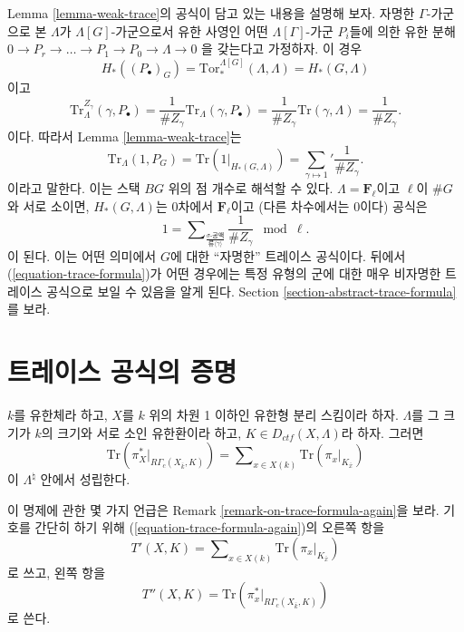 \begin{remark}
\label{remark-content-trivial-trace}
Lemma \ref{lemma-weak-trace}의 공식이 담고 있는 내용을 설명해 보자.
자명한 $\Gamma$-가군으로 본 $\Lambda$가
$\Lambda[G]$-가군으로서 유한 사영인 어떤
$\Lambda[\Gamma]$-가군 $P_i$들에 의한 유한 분해
$
0\to P_r\to \ldots \to P_1 \to P_0\to \Lambda\to 0
$
을 갖는다고 가정하자. 이 경우
$$
H_*\left(\left(P_\bullet\right)_G\right) =
\text{Tor}_*^{\Lambda[G]}\left(\Lambda, \Lambda\right) = H_*(G, \Lambda)
$$
이고
$$
\text{Tr}_\Lambda^{Z_\gamma}\left(\gamma, P_\bullet\right) =\frac{1}{\#
Z_\gamma}\text{Tr}_\Lambda(\gamma, P_\bullet)=\frac{1}{\#
Z_\gamma}\text{Tr}(\gamma, \Lambda) = \frac{1}{\# Z_\gamma}.
$$
이다. 따라서 Lemma \ref{lemma-weak-trace}는
$$
\text{Tr}_\Lambda (1 , P_G)
= \text{Tr}\left(1 |_{H_*(G, \Lambda)}\right)
= {\sum_{\gamma\mapsto 1}}'\frac{1}{\# Z_\gamma}.
$$
이라고 말한다. 이는 스택 $BG$ 위의 점 개수로 해석할 수 있다.
$\Lambda = \mathbf{F}_\ell$이고 $\ell$이 $\# G$와 서로 소이면,
$H_*(G, \Lambda)$는 0차에서 $\mathbf{F}_\ell$이고
(다른 차수에서는 $0$이다) 공식은
$$
1 =
\sum\nolimits_{
\frac{\sigma\text{-공액}}{\text{류}\langle\gamma\rangle}
}
\frac{1}{\# Z_\gamma} \mod \ell.
$$
이 된다. 이는 어떤 의미에서 $G$에 대한 “자명한” 트레이스 공식이다.
뒤에서 (\ref{equation-trace-formula})가 어떤 경우에는 특정 유형의
군에 대한 매우 비자명한 트레이스 공식으로 보일 수 있음을 알게 된다.
Section \ref{section-abstract-trace-formula}를 보라.
\end{remark}





\section{트레이스 공식의 증명}
\label{section-proof-trace-formula}

\begin{theorem}
\label{theorem-trace-formula-again}
$k$를 유한체라 하고, $X$를 $k$ 위의 차원 1 이하인 유한형 분리
스킴이라 하자. $\Lambda$를 그 크기가 $k$의 크기와 서로 소인
유한환이라 하고, $K\in D_{ctf}(X, \Lambda)$라 하자. 그러면
\begin{equation}
\label{equation-trace-formula-again}
\text{Tr}(\pi_X^* |_{R\Gamma_c(X_{\bar k}, K)})
=
\sum\nolimits_{x\in X(k)}
\text{Tr}(\pi_x |_{K_{\bar x}})
\end{equation}
이 $\Lambda^{\natural}$ 안에서 성립한다.
\end{theorem}

\noindent
이 명제에 관한 몇 가지 언급은 Remark
\ref{remark-on-trace-formula-again}을 보라. 기호를 간단히 하기 위해
(\ref{equation-trace-formula-again})의 오른쪽 항을
$$
T'(X, K) =
\sum\nolimits_{x\in X(k)}
\text{Tr}(\pi_x |_{K_{\bar x}})
$$
로 쓰고, 왼쪽 항을
$$
T''(X, K)
=\text{Tr}(\pi_x^* |_{R\Gamma_c(X_{\bar k}, K)})
$$
로 쓴다.

